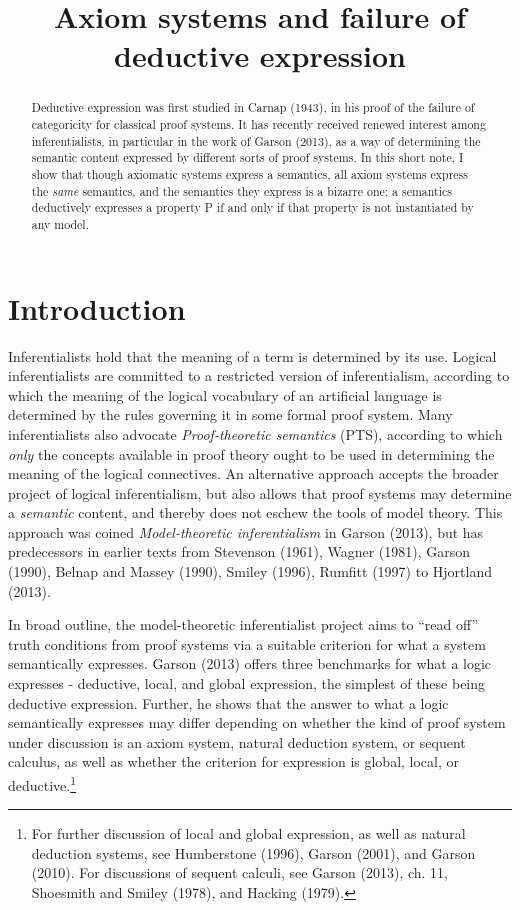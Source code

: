 \documentclass[]{article}
\title{Axiom systems and failure of deductive expression}
\author{}
\begin{document}
\maketitle

\begin{abstract}
Deductive expression was first studied in Carnap (1943), in his proof of the failure of categoricity for classical proof systems. It has recently received renewed interest among inferentialists, in particular in the work of Garson (2013), as a way of determining the semantic content expressed by different sorts of proof systems. In this short note, I show that though axiomatic systems express a semantics, all axiom systems express the \textit{same} semantics, and the semantics they express is a bizarre one: a semantics deductively expresses a property P if and only if that property is not instantiated by any model. 
\end{abstract}

\section{Introduction}
Inferentialists hold that the meaning of a term is determined by its use. Logical inferentialists are committed to a restricted version of inferentialism, according to which the meaning of the logical vocabulary of an artificial language is determined by the rules governing it in some formal proof system. Many inferentialists also advocate \textit{Proof-theoretic semantics} (PTS), according to which \textit{only} the concepts available in proof theory ought to be used in determining the meaning of the logical connectives. An alternative approach accepts the broader project of logical inferentialism, but also allows that proof systems may determine a \textit{semantic} content, and thereby does not eschew the tools of model theory. This approach was coined \textit{Model-theoretic inferentialism} in Garson (2013), but has predecessors in earlier texts from Stevenson (1961), Wagner (1981), Garson (1990), Belnap and Massey (1990), Smiley (1996), Rumfitt (1997) to Hjortland (2013).

In broad outline, the model-theoretic inferentialist project aims to ``read off'' truth conditions from proof systems via a suitable criterion for what a system semantically expresses. Garson (2013) offers three benchmarks for what a logic expresses - deductive, local, and global expression, the simplest of these being deductive expression. Further, he shows that the answer to what a logic semantically expresses may differ depending on whether the kind of proof system under discussion is an axiom system, natural deduction system, or sequent calculus, as well as whether the criterion for expression is global, local, or deductive.\footnote{For further discussion of local and global expression, as well as natural deduction systems, see Humberstone (1996), Garson (2001), and Garson (2010). For discussions of sequent calculi, see Garson (2013), ch. 11, Shoesmith and Smiley (1978), and Hacking (1979).}
\end{document}
